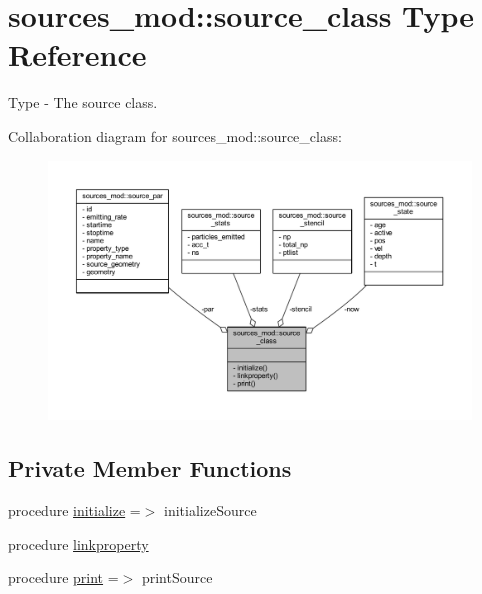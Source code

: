 \hypertarget{structsources__mod_1_1source__class}{}\section{sources\+\_\+mod\+:\+:source\+\_\+class Type Reference}
\label{structsources__mod_1_1source__class}


Type -\/ The source class.  




Collaboration diagram for sources\+\_\+mod\+:\+:source\+\_\+class\+:\nopagebreak
\begin{figure}[H]
\begin{center}
\leavevmode
\includegraphics[width=350pt]{structsources__mod_1_1source__class__coll__graph}
\end{center}
\end{figure}
\subsection*{Private Member Functions}
\begin{DoxyCompactItemize}
\item 
procedure \mbox{\hyperlink{structsources__mod_1_1source__class_a996650639d039c09d2b77a36473e977e}{initialize}} =$>$ initialize\+Source
\item 
procedure \mbox{\hyperlink{structsources__mod_1_1source__class_a30cdd922a476d166a673c76c451bc381}{linkproperty}}
\item 
procedure \mbox{\hyperlink{structsources__mod_1_1source__class_af632299e6c5e29a7f2008417aa68d529}{print}} =$>$ print\+Source
\end{DoxyCompactItemize}
